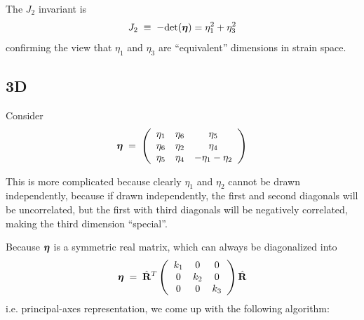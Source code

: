 \documentclass[12pt]{article}
\def\bmath#1{\mbox{\boldmath$#1$}}
\begin{document}
The $J_2$ invariant is 
\begin{equation}
 J_2 \;\equiv\; -{\rm det}({\bf \bmath{\eta}}) = {\eta}_1^2 + {\eta}_3^2
\end{equation}
confirming the view that ${\eta}_1$ and
${\eta}_3$ are ``equivalent'' dimensions in strain space.


\subsection{3D}

Consider 
\begin{equation}
 \bmath{\eta} \;=\; 
\left(\begin{array}{ccc}
 \eta_1 & \eta_6 & \eta_5 \\
 \eta_6 & \eta_2 & \eta_4 \\
 \eta_5 & \eta_4 & -\eta_1-\eta_2
\end{array}\right)
\end{equation}

This is more complicated because clearly $\eta_1$ and $\eta_2$ cannot
be drawn independently, because if drawn independently, the first and
second diagonals will be uncorrelated, but the first with third
diagonals will be negatively correlated, making the third dimension
``special''.

Because $\bmath{\eta}$ is a symmetric real matrix, which can always be
diagonalized into
\begin{equation}
 \bmath{\eta} \;=\; \hat{\bf R}^T \left(\begin{array}{ccc}
 k_1 & 0 & 0 \\
 0 & k_2 & 0 \\
 0 & 0 & k_3
\end{array}\right) \hat{\bf R}
 \label{PrincipalAxesRepresentation}
\end{equation}
i.e.  principal-axes representation, we come up with the following
algorithm:
\end{document}
